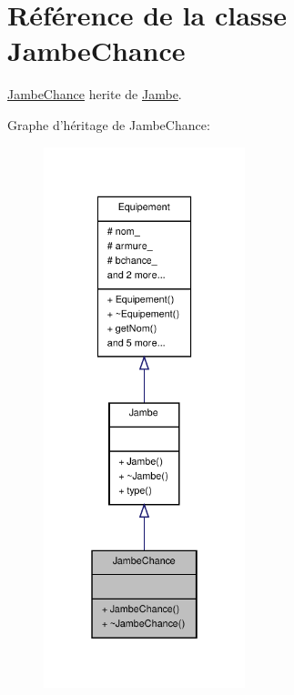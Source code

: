 \hypertarget{class_jambe_chance}{\section{Référence de la classe Jambe\-Chance}
\label{class_jambe_chance}
}


\hyperlink{class_jambe_chance}{Jambe\-Chance} herite de \hyperlink{class_jambe}{Jambe}.  




Graphe d'héritage de Jambe\-Chance\-:
\nopagebreak
\begin{figure}[H]
\begin{center}
\leavevmode
\includegraphics[width=166pt]{class_jambe_chance__inherit__graph}
\end{center}
\end{figure}


